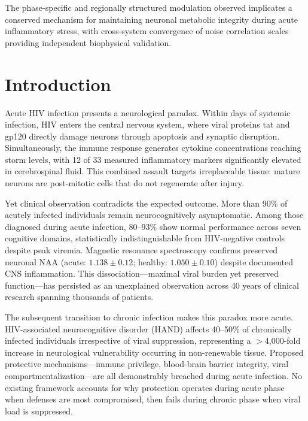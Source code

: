 \documentclass[10pt,a4paper]{article}
\begin{document}
The phase-specific and regionally structured modulation observed implicates a conserved mechanism for maintaining neuronal metabolic integrity during acute inflammatory stress, with cross-system convergence of noise correlation scales providing independent biophysical validation.

\section{Introduction}

Acute HIV infection presents a neurological paradox. Within days of systemic infection, HIV enters the central nervous system, where viral proteins tat and gp120 directly damage neurons through apoptosis and synaptic disruption\cite{valcour2012,nath2002,kaul1999}. Simultaneously, the immune response generates cytokine concentrations reaching storm levels, with 12 of 33 measured inflammatory markers significantly elevated in cerebrospinal fluid\cite{stacey2009,muema2020}. This combined assault targets irreplaceable tissue: mature neurons are post-mitotic cells that do not regenerate after injury\cite{aranda2012,herrup2007}.

Yet clinical observation contradicts the expected outcome. More than 90\% of acutely infected individuals remain neurocognitively asymptomatic\cite{cheret2025}. Among those diagnosed during acute infection, 80--93\% show normal performance across seven cognitive domains, statistically indistinguishable from HIV-negative controls despite peak viremia\cite{moore2011,cohen2010,schacker1996}. Magnetic resonance spectroscopy confirms preserved neuronal NAA (acute: $1.138 \pm 0.12$; healthy: $1.050 \pm 0.10$) despite documented CNS inflammation\cite{sailasuta2012}. This dissociation---maximal viral burden yet preserved function---has persisted as an unexplained observation across 40 years of clinical research spanning thousands of patients.

The subsequent transition to chronic infection makes this paradox more acute. HIV-associated neurocognitive disorder (HAND) affects 40--50\% of chronically infected individuals irrespective of viral suppression\cite{thompson2024}, representing a $>$4,000-fold increase in neurological vulnerability occurring in non-renewable tissue. Proposed protective mechanisms---immune privilege\cite{carson2006}, blood-brain barrier integrity\cite{banks2006}, viral compartmentalization\cite{joseph2019}---are all demonstrably breached during acute infection\cite{valcour2012,rahimy2015}. No existing framework accounts for why protection operates during acute phase when defenses are most compromised, then fails during chronic phase when viral load is suppressed.
\end{document}
